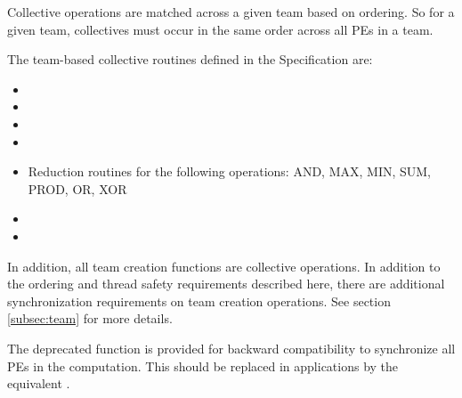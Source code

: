 {Collective operations are matched across a given team based on ordering. So for a given team,
collectives must occur in the same order across all PEs in a team.

The team-based collective routines defined in the \openshmem Specification are:

\begin{itemize}
\item {}
\item {}
\item {}
\item {}
\item Reduction routines for the following operations: AND, MAX, MIN, SUM, PROD, OR, XOR
\item {}
\item {}
\end{itemize}

In addition, all team creation functions are collective operations. In addition to the ordering
and thread safety requirements described here, there are additional synchronization requirements
on team creation operations. See section \ref{subsec:team} for more details.

The deprecated function  is provided for backward compatibility to synchronize
all \acp{PE} in the computation. This should be replaced in applications by the equivalent
.
}

